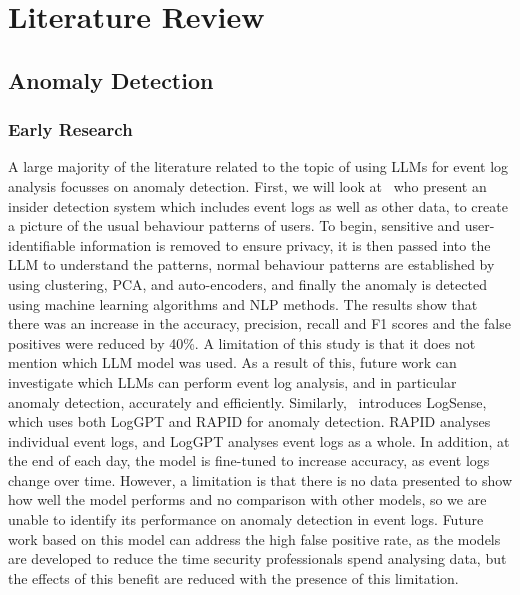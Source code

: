 \section{Literature Review}
\subsection{Anomaly Detection}
\subsubsection{Early Research}
A large majority of the literature related to the topic of using LLMs for event log analysis focusses on anomaly detection. First, we will look at~\cite{kethireddyai} who present an insider detection system which includes event logs as well as other data, to create a picture of the usual behaviour patterns of users. To begin, sensitive and user-identifiable information is removed to ensure privacy, it is then passed into the LLM to understand the patterns, normal behaviour patterns are established by using clustering, PCA, and auto-encoders, and finally the anomaly is detected using machine learning algorithms and NLP methods. The results show that there was an increase in the accuracy, precision, recall and F1 scores and the false positives were reduced by 40\%. A limitation of this study is that it does not mention which LLM model was used. As a result of this, future work can investigate which LLMs can perform event log analysis, and in particular anomaly detection, accurately and efficiently. Similarly,~\cite{srivatsalogsense} introduces LogSense, which uses both LogGPT and RAPID for anomaly detection. RAPID analyses individual event logs, and LogGPT analyses event logs as a whole. In addition, at the end of each day, the model is fine-tuned to increase accuracy, as event logs change over time. However, a limitation is that there is no data presented to show how well the model performs and no comparison with other models, so we are unable to identify its performance on anomaly detection in event logs. Future work based on this model can address the high false positive rate, as the models are developed to reduce the time security professionals spend analysing data, but the effects of this benefit are reduced with the presence of this limitation.

